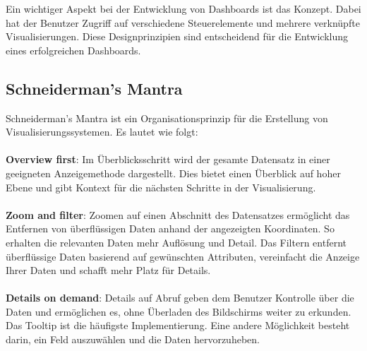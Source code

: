 \documentclass{article}
\begin{document}
Ein wichtiger Aspekt bei der Entwicklung von Dashboards ist das Konzept. Dabei hat der Benutzer Zugriff auf verschiedene Steuerelemente und mehrere verknüpfte Visualisierungen. Diese Designprinzipien sind entscheidend für die Entwicklung eines erfolgreichen Dashboards.

\subsection{Schneiderman’s Mantra}
Schneiderman's Mantra ist ein Organisationsprinzip für die Erstellung von Visualisierungssystemen. Es lautet wie folgt:\\ \\
\noindent
\textbf{Overview first}: Im Überblicksschritt wird der gesamte Datensatz in einer geeigneten Anzeigemethode dargestellt. Dies bietet einen Überblick auf hoher Ebene und gibt Kontext für die nächsten Schritte in der Visualisierung.\\ \\
\textbf{Zoom and filter}: Zoomen auf einen Abschnitt des Datensatzes ermöglicht das Entfernen von überflüssigen Daten anhand der angezeigten Koordinaten. So erhalten die relevanten Daten mehr Auflösung und Detail. Das Filtern entfernt überflüssige Daten basierend auf gewünschten Attributen, vereinfacht die Anzeige Ihrer Daten und schafft mehr Platz für Details.\\ \\
\textbf{Details on demand}: Details auf Abruf geben dem Benutzer Kontrolle über die Daten und ermöglichen es, ohne Überladen des Bildschirms weiter zu erkunden. Das Tooltip ist die häufigste Implementierung. Eine andere Möglichkeit besteht darin, ein Feld auszuwählen und die Daten hervorzuheben.\cite{hampdatavisualization_schneidermans_2016}



\newpage
\printbibliography
\end{document}
